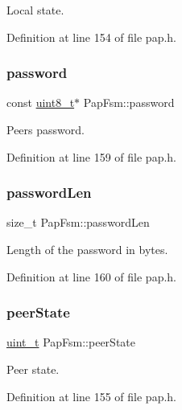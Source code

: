 Local state. 



Definition at line 154 of file pap.\+h.

\mbox{\label{structPapFsm_ae09f94531c2c998e501561504c407aa3}} 
\subsubsection{\texorpdfstring{password}{password}}
{\footnotesize\ttfamily const \hyperlink{stdint_8h_aba7bc1797add20fe3efdf37ced1182c5}{uint8\+\_\+t}$\ast$ Pap\+Fsm\+::password}



Peer\textquotesingle{}s password. 



Definition at line 159 of file pap.\+h.

\mbox{\label{structPapFsm_aca5089d6f6410e1479038f36bb2232b7}} 
\subsubsection{\texorpdfstring{password\+Len}{passwordLen}}
{\footnotesize\ttfamily size\+\_\+t Pap\+Fsm\+::password\+Len}



Length of the password in bytes. 



Definition at line 160 of file pap.\+h.

\mbox{\label{structPapFsm_a325cd51c0faa4171af5355dee5637e46}} 
\subsubsection{\texorpdfstring{peer\+State}{peerState}}
{\footnotesize\ttfamily \hyperlink{compiler__port_8h_a12a1e9b3ce141648783a82445d02b58d}{uint\+\_\+t} Pap\+Fsm\+::peer\+State}



Peer state. 



Definition at line 155 of file pap.\+h.

